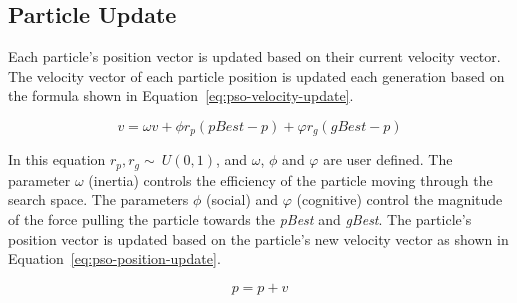 \subsection{Particle Update}
\label{subsec:pso-position}

Each particle's position vector is updated based on their current velocity vector. The velocity vector of each particle position is updated each generation based on the formula shown in Equation~\ref{eq:pso-velocity-update}.

\begin{equation}
	\label{eq:pso-velocity-update}
	v = \omega{v} + \phi{r_p}(pBest-p) + \varphi{r_g}(gBest-p)
\end{equation}

In this equation $r_p, r_g \sim\ U(0,1)$, and $\omega$, $\phi$ and $\varphi$ are user defined. The parameter $\omega$ (inertia) controls the efficiency of the particle moving through the search space. The parameters $\phi$ (social) and $\varphi$ (cognitive) control the magnitude of the force pulling the particle towards the \textit{pBest} and \textit{gBest}. The particle's position vector is updated based on the particle's new velocity vector as shown in Equation~\ref{eq:pso-position-update}.

\begin{equation}
	\label{eq:pso-position-update}
	p = p + v
\end{equation}